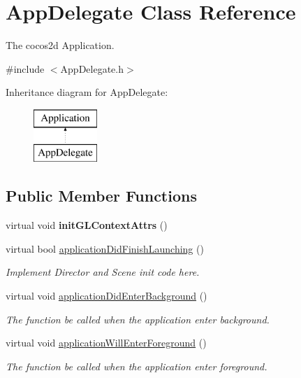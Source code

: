 \hypertarget{class_app_delegate}{}\section{App\+Delegate Class Reference}
\label{class_app_delegate}


The cocos2d Application.  




{\ttfamily \#include $<$App\+Delegate.\+h$>$}

Inheritance diagram for App\+Delegate\+:\begin{figure}[H]
\begin{center}
\leavevmode
\includegraphics[height=2.000000cm]{class_app_delegate}
\end{center}
\end{figure}
\subsection*{Public Member Functions}
\begin{DoxyCompactItemize}
\item 
virtual void {\bfseries init\+G\+L\+Context\+Attrs} ()\hypertarget{class_app_delegate_a2de4e8ab7d04bde311684e1d4ceb2c0f}{}\label{class_app_delegate_a2de4e8ab7d04bde311684e1d4ceb2c0f}

\item 
virtual bool \hyperlink{class_app_delegate_a68cbaed49edf7581dc59a09d5062fff3}{application\+Did\+Finish\+Launching} ()
\begin{DoxyCompactList}\small\item\em Implement Director and Scene init code here. \end{DoxyCompactList}\item 
virtual void \hyperlink{class_app_delegate_a17cb09777419781698324e0415bffd3a}{application\+Did\+Enter\+Background} ()
\begin{DoxyCompactList}\small\item\em The function be called when the application enter background. \end{DoxyCompactList}\item 
virtual void \hyperlink{class_app_delegate_ac4d653e3f74a91efef5f2def58fe3108}{application\+Will\+Enter\+Foreground} ()
\begin{DoxyCompactList}\small\item\em The function be called when the application enter foreground. \end{DoxyCompactList}\end{DoxyCompactItemize}


